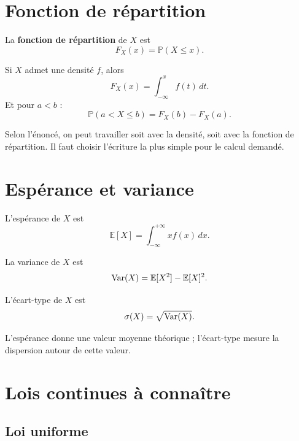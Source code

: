\section{Fonction de répartition}

\begin{Def}
La \textbf{fonction de répartition} de $X$ est
$$
F_X(x)=\mathbb{P}(X\leq x).
$$
\end{Def}

\begin{Prop}
Si $X$ admet une densité $f$, alors
$$
F_X(x)=\int_{-\infty}^x f(t)\,dt.
$$
Et pour $a<b$ :
$$
\mathbb{P}(a<X\leq b)=F_X(b)-F_X(a).
$$
\end{Prop}

\begin{Rmq}
Selon l'énoncé, on peut travailler soit avec la densité, soit avec la fonction de répartition. Il faut choisir l'écriture la plus simple pour le calcul demandé.
\end{Rmq}

\section{Espérance et variance}

\begin{Def}
L'espérance de $X$ est
$$
\mathbb{E}[X]=\int_{-\infty}^{+\infty} x f(x)\,dx.
$$
\end{Def}

\begin{Def}
La variance de $X$ est
$$
\operatorname{Var}(X)=\mathbb{E}[X^2]-\mathbb{E}[X]^2.
$$
\end{Def}

\begin{Def}
L'écart-type de $X$ est
$$
\sigma(X)=\sqrt{\operatorname{Var}(X)}.
$$
\end{Def}

\begin{Rmq}
L'espérance donne une valeur moyenne théorique ; l'écart-type mesure la dispersion autour de cette valeur.
\end{Rmq}

\section{Lois continues à connaître}

\subsection{Loi uniforme}

